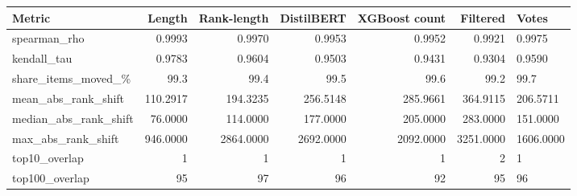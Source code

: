 \begin{tabular}{lrrrrr}
\hline
Metric & Length & Rank-length & DistilBERT & XGBoost count & Filtered & Votes \\
\hline
spearman\_rho & 0.9993 & 0.9970 & 0.9953 & 0.9952 & 0.9921 & 0.9975 \\
\hline
kendall\_tau & 0.9783 & 0.9604 & 0.9503 & 0.9431 & 0.9304 & 0.9590 \\
\hline
share\_items\_moved\_\% & 99.3 & 99.4 & 99.5 & 99.6 & 99.2 & 99.7 \\
\hline
mean\_abs\_rank\_shift & 110.2917 & 194.3235 & 256.5148 & 285.9661 & 364.9115 & 206.5711 \\
\hline
median\_abs\_rank\_shift & 76.0000 & 114.0000 & 177.0000 & 205.0000 & 283.0000 & 151.0000 \\
\hline
max\_abs\_rank\_shift & 946.0000 & 2864.0000 & 2692.0000 & 2092.0000 & 3251.0000 & 1606.0000 \\
\hline
top10\_overlap & 1 & 1 & 1 & 1 & 2 & 1 \\
\hline
top100\_overlap & 95 & 97 & 96 & 92 & 95 & 96 \\
\hline
\end{tabular}
